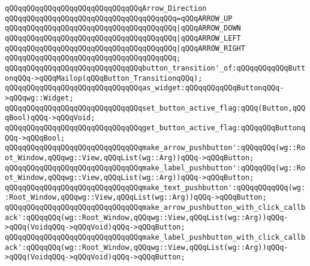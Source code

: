 \newline
\verb|qQQqqQQqqQQqqQQqqQQqqQQqqQQqqQQqArrow_Direction|\newline
\verb|qQQqqQQqqQQqqQQqqQQqqQQqqQQqqQQqqQQqqQQq=qQQqARROW_UP|\newline
\verb|qQQqqQQqqQQqqQQqqQQqqQQqqQQqqQQqqQQqqQQq|\verb#|qQQqARROW_DOWN#\newline
\verb|qQQqqQQqqQQqqQQqqQQqqQQqqQQqqQQqqQQqqQQq|\verb#|qQQqARROW_LEFT#\newline
\verb|qQQqqQQqqQQqqQQqqQQqqQQqqQQqqQQqqQQqqQQq|\verb#|qQQqARROW_RIGHT#\newline
\verb|qQQqqQQqqQQqqQQqqQQqqQQqqQQqqQQqqQQqqQQq;|\newline
\newline
\newline
\verb|qQQqqQQqqQQqqQQqqQQqqQQqqQQqqQQqbutton_transition'_of:qQQqqQQqqQQqButtonqQQq->qQQqMailop(qQQqButton_TransitionqQQq);|\newline
\newline
\verb|qQQqqQQqqQQqqQQqqQQqqQQqqQQqqQQqas_widget:qQQqqQQqqQQqButtonqQQq->qQQqwg::Widget;|\newline
\newline
\verb|qQQqqQQqqQQqqQQqqQQqqQQqqQQqqQQqset_button_active_flag:qQQq(Button,qQQqBool)qQQq->qQQqVoid;|\newline
\verb|qQQqqQQqqQQqqQQqqQQqqQQqqQQqqQQqget_button_active_flag:qQQqqQQqButtonqQQq->qQQqBool;|\newline
\newline
\verb|qQQqqQQqqQQqqQQqqQQqqQQqqQQqqQQqmake_arrow_pushbutton':qQQqqQQq(wg::Root_Window,qQQqwg::View,qQQqList(wg::Arg))qQQq->qQQqButton;|\newline
\verb|qQQqqQQqqQQqqQQqqQQqqQQqqQQqqQQqmake_label_pushbutton':qQQqqQQq(wg::Root_Window,qQQqwg::View,qQQqList(wg::Arg))qQQq->qQQqButton;|\newline
\verb|qQQqqQQqqQQqqQQqqQQqqQQqqQQqqQQqmake_text_pushbutton':qQQqqQQqqQQq(wg::Root_Window,qQQqwg::View,qQQqList(wg::Arg))qQQq->qQQqButton;|\newline
\newline
\verb|qQQqqQQqqQQqqQQqqQQqqQQqqQQqqQQqmake_arrow_pushbutton_with_click_callback':qQQqqQQq(wg::Root_Window,qQQqwg::View,qQQqList(wg::Arg))qQQq->qQQq(VoidqQQq->qQQqVoid)qQQq->qQQqButton;|\newline
\verb|qQQqqQQqqQQqqQQqqQQqqQQqqQQqqQQqmake_label_pushbutton_with_click_callback':qQQqqQQq(wg::Root_Window,qQQqwg::View,qQQqList(wg::Arg))qQQq->qQQq(VoidqQQq->qQQqVoid)qQQq->qQQqButton;|\newline
